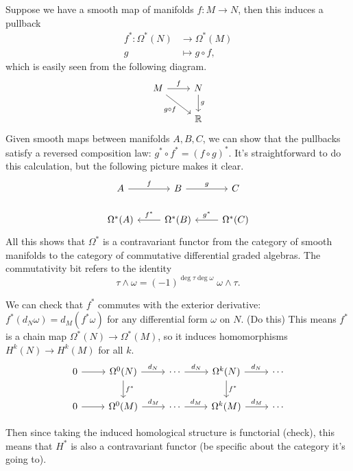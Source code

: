 \documentclass[twoside,10pt]{report}
\begin{document}
Suppose we have a smooth map of manifolds $f:M\to N$, then this induces a pullback
\begin{align*}
	f^{*}:\Omega^{*}(N)&\to \Omega^{*}(M)\\
	g&\mapsto g\circ f,
\end{align*}
which is easily seen from the following diagram.
\[
\begin{tikzcd}
	M\rar{f}\arrow[dr,"g\circ f"']&N\dar{g}\\
				     &\mathbb{R}
\end{tikzcd}
\]
Given smooth maps between manifolds $A,B,C$, we can show that the pullbacks satisfy a reversed composition law: $g^{*}\circ f^{*}=(f\circ g)^{*}$. {\color{red}It's straightforward} to do this calculation, but the following picture makes it clear.
\[
\begin{tikzcd}
	A\rar{f}&B\rar{g}&C\\
	\Omega^{*}(A)&\Omega^{*}(B)\arrow[l,"f^{*}"']&\Omega^{*}(C)\arrow[l,"g^{*}"']
\end{tikzcd}
\] All this shows that $\Omega^{*}$ is a contravariant functor from the category of smooth manifolds to the category of commutative differential graded algebras. The commutativity bit refers to the identity
\[
	\tau \wedge \omega = (-1)^{\deg \tau \deg \omega} \; \omega \wedge \tau.
\] 

We can check that $f^{*}$ commutes with the exterior derivative: $f^{*}(d_{N}\omega) = d_{M}(f^{*}\omega)$ for any differential form $\omega$ on $N$. {\color{red}(Do this)} This means $f^{*}$ is a chain map $\Omega^{*}(N) \to \Omega^{*}(M)$, so it induces homomorphisms $H^{k}(N)\to H^{k}(M)$ for all $k$.
\[
\begin{tikzcd}
	0\rar&\Omega^{0}(N)\rar{d_{N}}\dar{f^{*}}&\cdots\rar{d_{N}}&\Omega^{k}(N)\rar{d_{N}}\dar{f^{*}}&\cdots\\
	0\rar&\Omega^{0}(M)\rar{d_{M}}&\cdots\rar{d_{M}}&\Omega^{k}(M)\rar{d_{M}}&\cdots
\end{tikzcd}
\] 

Then since taking the induced homological structure is functorial {\color{red}(check)}, this means that $H^{*}$ is also a contravariant functor {\color{red}(be specific about the category it's going to)}.
\end{document}

